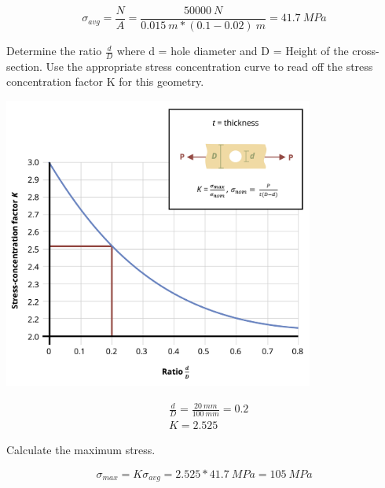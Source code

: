 \documentclass[
  letterpaper,
  DIV=11,
  numbers=noendperiod]{scrreprt}
\begin{document}
\begin{tcolorbox}
\begin{tcolorbox}
\[
\sigma_{a v g}=\frac{N}{A}=\frac{50000{~N}}{0.015{~m} *(0.1-0.02){~m}}=41.7{~MPa}
\]

Determine the ratio \(\frac{d}{D}\) where d = hole diameter and D =
Height of the cross-section. Use the appropriate stress concentration
curve to read off the stress concentration factor K for this geometry.

\begin{center}
\includegraphics[width=4.02083in,height=\textheight]{images/PNGs/Example 5.1 part 3.png}
\end{center}

\[
\begin{aligned}
&\frac{d}{D}=\frac{20{~mm}}{100{~mm}}=0.2\\
&K=2.525
\end{aligned}
\]

Calculate the maximum stress.

\[
\sigma_{max }=K \sigma_{avg}=2.525*41.7{~MPa}=105{~MPa}
\]

\end{tcolorbox}

\end{tcolorbox}
\end{document}
